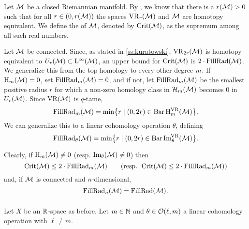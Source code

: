 \subsubsection{}\label{subsub:first_critical_value}\label{subsub:beta v.s. fillrad}

Let \(\cM\) be a closed Riemannian manifold.
By \cite[Thm.3.5]{hausmann1995vietoris}, we know that there is a \(r(\cM) > 0\) such that for all \(r \in (0,r(\cM))\) the spaces \(\VR_r(\cM)\) and \(\cM\) are homotopy equivalent.
We define the  of \(\cM\), denoted by \(\crit(\cM)\), as the supremum among all such real numbers.

Let \(\cM\) be connected.
Since, as stated in \cref{ss:kuratowski}, \(\VR_{2r}(\cM)\) is homotopy equivalent to \(U_r(\cM) \subset \rL^\infty(\cM)\), an upper bound for \(\crit(\cM)\) is \(2\cdot\fillrad(\cM)\).
We generalize this from the top homology to every other degree \(\degp\).
If \(\rH_\degp(\cM) = 0\), set \(\fillrad_m(\cM) = 0\), and if not, let \(\fillrad_m(\cM)\) be the smallest positive radius $r$ for which a non-zero homology class in \(\cH_\degp(\cM)\) becomes \(0\) in \(U_r(\cM)\).
Since \(\VR(\cM)\) is \(q\)-tame,
\[
\fillrad_m(\cM) = \min\set[\big]{r \mid (0, 2r) \in \barc \rH^{\VR}_m(\cM)}.
\]
We can generalize this to a linear cohomology operation \(\theta\), defining
\[
\fillrad_\theta(\cM) = \min\set[\big]{r \mid (0, 2r) \in \barc \img_\theta^{\!\VR}(\cM)}.
\]


Clearly, if \(\rH_m(\cM) \neq 0\) (resp. \(\img_\theta(\cM) \neq 0\)) then
\[
\crit(\cM) \leq 2 \cdot \fillrad_m(\cM) \qquad (\text{resp. } \crit(\cM) \leq 2 \cdot \fillrad_m(\cM))
\]
and, if \(\cM\) is connected and \(n\)-dimensional,
\[
\fillrad_n(\cM) = \fillrad(\cM).
\]

\subsubsection{}\label{subsub:barcode_general}

Let $X$ be an $\R$-space as before.
Let \(\degp \in \N\) and \(\theta \in \cO(\ell,\degp)\) a linear cohomology operation with $\ell \neq m$.

